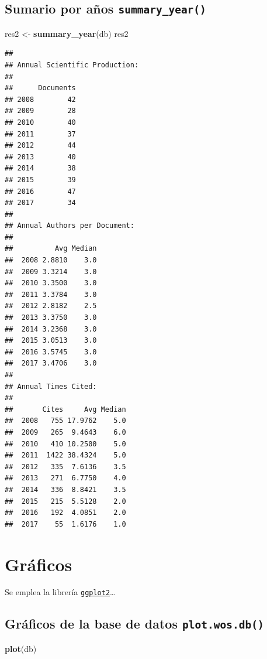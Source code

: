 \documentclass[]{book}
\newenvironment{Shaded}{\begin{snugshade}}{\end{snugshade}}
\newcommand{\KeywordTok}[1]{\textcolor[rgb]{0.13,0.29,0.53}{\textbf{#1}}}
\newcommand{\StringTok}[1]{\textcolor[rgb]{0.31,0.60,0.02}{#1}}
\newcommand{\NormalTok}[1]{#1}
\begin{document}
\subsection{\texorpdfstring{Sumario por años
\texttt{summary\_year()}}{Sumario por años summary\_year()}}\label{sumario-por-auxf1os-summary_year}

\begin{Shaded}
\begin{Highlighting}[]
\NormalTok{res2 <-}\StringTok{ }\KeywordTok{summary_year}\NormalTok{(db)}
\NormalTok{res2}
\end{Highlighting}
\end{Shaded}

\begin{verbatim}
## 
## Annual Scientific Production:
## 
##      Documents
## 2008        42
## 2009        28
## 2010        40
## 2011        37
## 2012        44
## 2013        40
## 2014        38
## 2015        39
## 2016        47
## 2017        34
## 
## Annual Authors per Document:
## 
##          Avg Median
##  2008 2.8810    3.0
##  2009 3.3214    3.0
##  2010 3.3500    3.0
##  2011 3.3784    3.0
##  2012 2.8182    2.5
##  2013 3.3750    3.0
##  2014 3.2368    3.0
##  2015 3.0513    3.0
##  2016 3.5745    3.0
##  2017 3.4706    3.0
## 
## Annual Times Cited:
## 
##       Cites     Avg Median
##  2008   755 17.9762    5.0
##  2009   265  9.4643    6.0
##  2010   410 10.2500    5.0
##  2011  1422 38.4324    5.0
##  2012   335  7.6136    3.5
##  2013   271  6.7750    4.0
##  2014   336  8.8421    3.5
##  2015   215  5.5128    2.0
##  2016   192  4.0851    2.0
##  2017    55  1.6176    1.0
\end{verbatim}

\section{Gráficos}\label{gruxe1ficos}

Se emplea la librería
\href{https://ggplot2.tidyverse.org}{\texttt{ggplot2}}\ldots{}

\subsection{\texorpdfstring{Gráficos de la base de datos
\texttt{plot.wos.db()}}{Gráficos de la base de datos plot.wos.db()}}\label{gruxe1ficos-de-la-base-de-datos-plot.wos.db}

\begin{Shaded}
\begin{Highlighting}[]
\KeywordTok{plot}\NormalTok{(db)}
\end{Highlighting}
\end{Shaded}
\end{document}
